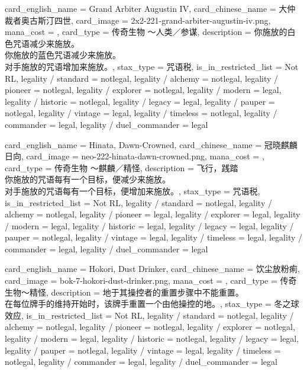 \documentclass[lang = cn, color = black, 10pt]{AllThatStax}
\begin{document}
\card
{
	card_english_name = {Grand Arbiter Augustin IV},
	card_chinese_name = {大仲裁者奥古斯汀四世},
	card_image = 2x2-221-grand-arbiter-augustin-iv.png,
	mana_cost = ,
	card_type = 传奇生物 ～人类／参谋,
	description = {你施放的白色咒语减少来施放。\\
		你施放的蓝色咒语减少来施放。\\
		对手施放的咒语增加来施放。},
	stax_type = 咒语税,
	is_in_restricted_list = Not RL,
	legality / standard = notlegal,
	legality / alchemy = notlegal,
	legality / pioneer = notlegal,
	legality / explorer = notlegal,
	legality / modern = legal,
	legality / historic = notlegal,
	legality / legacy = legal,
	legality / pauper = notlegal,
	legality / vintage = legal,
	legality / timeless = notlegal,
	legality / commander = legal,
	legality / duel_commander = legal
}

\card
{
	card_english_name = {Hinata, Dawn-Crowned},
	card_chinese_name = {冠晓麒麟日向},
	card_image = neo-222-hinata-dawn-crowned.png,
	mana_cost = ,
	card_type = 传奇生物 ～麒麟／精怪,
	description = {飞行，践踏\\
		你施放的咒语每有一个目标，便减少来施放。\\
		对手施放的咒语每有一个目标，便增加来施放。},
	stax_type = 咒语税,
	is_in_restricted_list = Not RL,
	legality / standard = notlegal,
	legality / alchemy = notlegal,
	legality / pioneer = legal,
	legality / explorer = legal,
	legality / modern = legal,
	legality / historic = legal,
	legality / legacy = legal,
	legality / pauper = notlegal,
	legality / vintage = legal,
	legality / timeless = legal,
	legality / commander = legal,
	legality / duel_commander = legal
}

\card
{
	card_english_name = {Hokori, Dust Drinker},
	card_chinese_name = {饮尘放粉痢},
	card_image = bok-7-hokori-dust-drinker.png,
	mana_cost = ,
	card_type = 传奇生物～精怪,
	description = {地于其操控者的重置步骤中不能重置。\\
		在每位牌手的维持开始时，该牌手重置一个由他操控的地。},
	stax_type = 冬之球效应,
	is_in_restricted_list = Not RL,
	legality / standard = notlegal,
	legality / alchemy = notlegal,
	legality / pioneer = notlegal,
	legality / explorer = notlegal,
	legality / modern = legal,
	legality / historic = notlegal,
	legality / legacy = legal,
	legality / pauper = notlegal,
	legality / vintage = legal,
	legality / timeless = notlegal,
	legality / commander = legal,
	legality / duel_commander = legal
}
\end{document}
